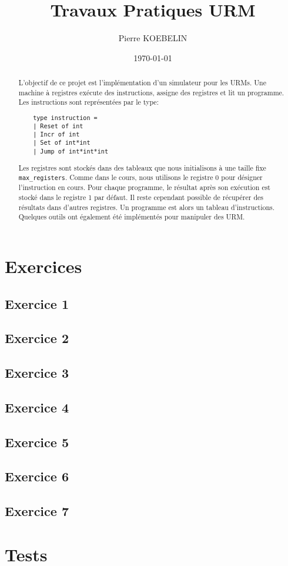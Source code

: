 \documentclass[11pt, a4paper, twoside, titlepage]{article}
\begin{document}
\title{{\titlefont Travaux Pratiques URM}}
\author{Pierre KOEBELIN}
\date{\today}
\maketitle

\begin{abstract}
	L'objectif de ce projet est l'implémentation d'un simulateur pour les URMs. Une machine à registres exécute des instructions, assigne des registres et lit un programme. Les instructions sont représentées par le type:
\begin{lstlisting}
	type instruction =
	| Reset of int
	| Incr of int
	| Set of int*int
	| Jump of int*int*int
\end{lstlisting}
	Les registres sont stockés dans des tableaux que nous initialisons à une taille fixe \texttt{max\_registers}. Comme dans le cours, nous utilisons le registre 0 pour désigner l’instruction en cours. Pour chaque programme, le résultat après son exécution est stocké dans le registre 1 par défaut. Il reste cependant possible de récupérer des résultats dans d'autres registres. Un programme est alors un tableau d’instructions.\\
	Quelques outils ont également été implémentés pour manipuler des URM.
\end{abstract}

\tableofcontents

\newpage
\section{Exercices}

\subsection{Exercice 1}

\subsection{Exercice 2}

\subsection{Exercice 3}

\subsection{Exercice 4}

\subsection{Exercice 5}

\subsection{Exercice 6}

\subsection{Exercice 7}

\section{Tests}
\end{document}
